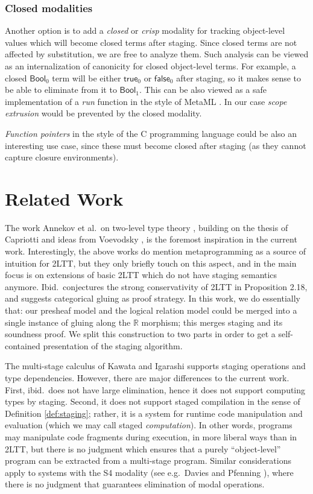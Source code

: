 \documentclass[acmsmall,anonymous,review]{acmart}
\newcommand{\msf}[1]{\mathsf{#1}}
\newcommand{\mbb}[1]{\mathbb{#1}}
\newcommand{\Bool}{\msf{Bool}}
\newcommand{\true}{\msf{true}}
\newcommand{\false}{\msf{false}}
\newcommand{\re}{\mbb{R}}
\theoremstyle{remark}
\begin{document}
\subsubsection{Closed modalities}\label{sec:closed-modalities}
Another option is to add a \emph{closed} or \emph{crisp} modality
\cite{licata2018internal} for tracking object-level values which will become
closed terms after staging. Since closed terms are not affected by substitution,
we are free to analyze them. Such analysis can be viewed as an internalization
of canonicity for closed object-level terms. For example, a closed $\Bool_0$
term will be either $\true_0$ or $\false_0$ after staging, so it makes sense to
be able to eliminate from it to $\Bool_1$. This can be also viewed as a safe
implementation of a \emph{run} function in the style of MetaML \cite{metaml}.
In our case \emph{scope extrusion} would be prevented by the closed modality.

\emph{Function pointers} in the style of the C programming language could be also
an interesting use case, since these must become closed after staging (as they
cannot capture closure environments).

\section{Related Work}\label{sec:related-work}

The work Annekov et al.\ on two-level type theory \cite{twolevel}, building on
the thesis of Capriotti \cite{capriotti2017models} and ideas from Voevodsky
\cite{hts}, is the foremost inspiration in the current work. Interestingly, the
above works do mention metaprogramming as a source of intuition for 2LTT, but
they only briefly touch on this aspect, and in \cite{twolevel} the main focus is
on extensions of basic 2LTT which do not have staging semantics
anymore. Ibid.\ conjectures the strong conservativity of 2LTT in Proposition
2.18, and suggests categorical gluing as proof strategy. In this work, we do
essentially that: our presheaf model and the logical relation model could be
merged into a single instance of gluing along the $\re$ morphism; this merges
staging and its soundness proof. We split this construction to two parts in order
to get a self-contained presentation of the staging algorithm.

The multi-stage calculus of Kawata and Igarashi \cite{multi-stage-calculus}
supports staging operations and type dependencies. However, there are major
differences to the current work. First, ibid.\ does not have large elimination,
hence it does not support computing types by staging. Second, it does not
support staged compilation in the sense of Definition \ref{def:staging}; rather,
it is a system for runtime code manipulation and evaluation (which we may call
staged \emph{computation}). In other words, programs may manipulate code
fragments during execution, in more liberal ways than in 2LTT, but there is no
judgment which ensures that a purely ``object-level'' program can be extracted
from a multi-stage program. Similar considerations apply to systems with the S4
modality (see e.g.\ Davies and Pfenning \cite{DBLP:journals/jacm/DaviesP01}),
where there is no judgment that guarantees elimination of modal operations.
\end{document}
